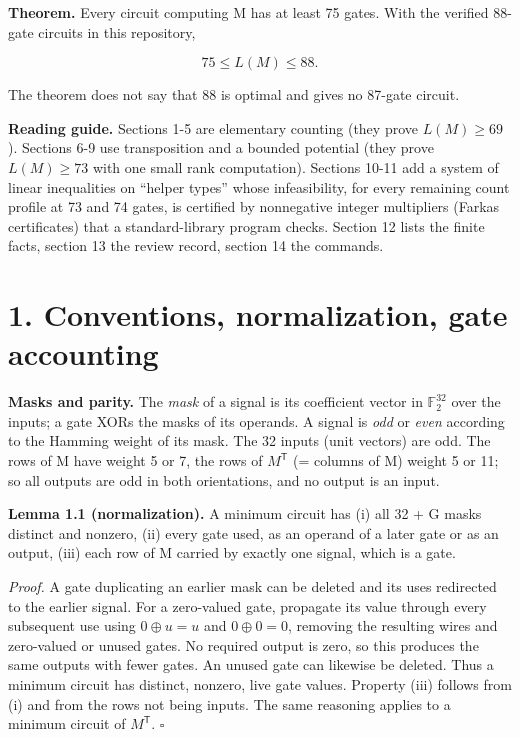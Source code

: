 \textbf{Theorem.} Every circuit computing M has at least 75 gates. With the verified 88-gate circuits in this repository,

\[
75\le L(M)\le88.
\]

The theorem does not say that 88 is optimal and gives no 87-gate circuit.

\textbf{Reading guide.} Sections 1-5 are elementary counting (they prove \(L(M)\ge69\)). Sections 6-9 use transposition and a bounded potential (they prove \(L(M)\ge73\) with one small rank computation). Sections 10-11 add a system of linear inequalities on ``helper types'' whose infeasibility, for every remaining count profile at 73 and 74 gates, is certified by nonnegative integer multipliers (Farkas certificates) that a standard-library program checks. Section 12 lists the finite facts, section 13 the review record, section 14 the commands.

\hypertarget{conventions-normalization-gate-accounting}{%
\section{1. Conventions, normalization, gate accounting}\label{conventions-normalization-gate-accounting}}

\textbf{Masks and parity.} The \emph{mask} of a signal is its coefficient vector in \(\mathbb F_2^{32}\) over the inputs; a gate XORs the masks of its operands. A signal is \emph{odd} or \emph{even} according to the Hamming weight of its mask. The 32 inputs (unit vectors) are odd. The rows of M have weight 5 or 7, the rows of \(M^{\mathsf T}\) (= columns of M) weight 5 or 11; so all outputs are odd in both orientations, and no output is an input.

\textbf{Lemma 1.1 (normalization).} A minimum circuit has (i) all 32 + G masks distinct and nonzero, (ii) every gate used, as an operand of a later gate or as an output, (iii) each row of M carried by exactly one signal, which is a gate.

\emph{Proof.} A gate duplicating an earlier mask can be deleted and its uses redirected to the earlier signal. For a zero-valued gate, propagate its value through every subsequent use using \(0\oplus u=u\) and \(0\oplus0=0\), removing the resulting wires and zero-valued or unused gates. No required output is zero, so this produces the same outputs with fewer gates. An unused gate can likewise be deleted. Thus a minimum circuit has distinct, nonzero, live gate values. Property (iii) follows from (i) and from the rows not being inputs. The same reasoning applies to a minimum circuit of \(M^{\mathsf T}\). \(\square\)

